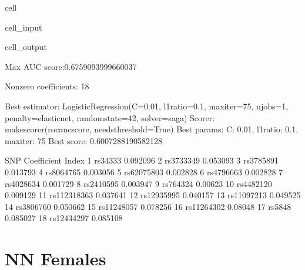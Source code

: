 \documentclass[letterpaper,10pt,english]{jupyterBook}
\begin{document}
\begin{sphinxuseclass}{cell}
\begin{sphinxVerbatimInput}
\begin{sphinxuseclass}{cell_input}
\end{sphinxuseclass}\end{sphinxVerbatimInput}
\begin{sphinxVerbatimOutput}

\begin{sphinxuseclass}{cell_output}
\begin{sphinxVerbatim}[commandchars=\\\{\}]
Max AUC score:0.6759093999660037

Non\PYGZhy{}zero coefficients: 18

Best estimator: LogisticRegression(C=0.01, l1\PYGZus{}ratio=0.1, max\PYGZus{}iter=75, n\PYGZus{}jobs=\PYGZhy{}1,
                   penalty=\PYGZsq{}elasticnet\PYGZsq{}, random\PYGZus{}state=42, solver=\PYGZsq{}saga\PYGZsq{})
Scorer: make\PYGZus{}scorer(roc\PYGZus{}auc\PYGZus{}score, needs\PYGZus{}threshold=True)
Best params: \PYGZob{}\PYGZsq{}C\PYGZsq{}: 0.01, \PYGZsq{}l1\PYGZus{}ratio\PYGZsq{}: 0.1, \PYGZsq{}max\PYGZus{}iter\PYGZsq{}: 75\PYGZcb{}
Best score: 0.6007288190582128
\end{sphinxVerbatim}

\begin{sphinxVerbatim}[commandchars=\\\{\}]
               SNP Coefficient
Index                         
1          rs34333   \PYGZhy{}0.092096
2        rs3733349   \PYGZhy{}0.053093
3        rs3785891   \PYGZhy{}0.013793
4        rs8064765   \PYGZhy{}0.003056
5       rs62075803   \PYGZhy{}0.002828
6        rs4796663   \PYGZhy{}0.002828
7        rs4028634    0.001729
8        rs2410595    0.003947
9         rs764324     0.00623
10       rs4482120    0.009129
11     rs112318363    0.037641
12      rs12935995    0.040157
13      rs11097213    0.049525
14       rs3806760    0.050662
15      rs11248057    0.078256
16      rs11264302     0.08048
17          rs5848    0.085027
18      rs12434297    0.085108
\end{sphinxVerbatim}

\end{sphinxuseclass}\end{sphinxVerbatimOutput}

\end{sphinxuseclass}

\section{NN Females}
\label{\detokenize{Cooper:nn-females}}
\end{document}
